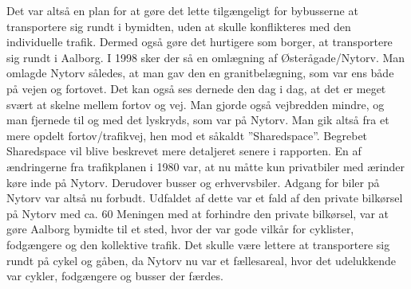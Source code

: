 Det var altså en plan for at gøre det lette tilgængeligt for bybusserne at transportere sig rundt i bymidten, uden at skulle konflikteres med den individuelle trafik. Dermed også gøre det hurtigere som borger, at transportere sig rundt i Aalborg.
I 1998 sker der så en omlægning af Østerågade/Nytorv. 
Man omlagde Nytorv således, at man gav den en granitbelægning, som var ens både på vejen og fortovet. Det kan også ses dernede den dag i dag, at det er meget svært at skelne mellem fortov og vej. Man gjorde også vejbredden mindre, og man fjernede til og med det lyskryds, som var på Nytorv. Man gik altså fra et mere opdelt fortov/trafikvej, hen mod et såkaldt ”Sharedspace”. Begrebet Sharedspace vil blive beskrevet mere detaljeret senere i rapporten. En af ændringerne fra trafikplanen i 1980 var, at nu måtte kun privatbiler med ærinder køre inde på Nytorv. Derudover busser og erhvervsbiler. Adgang for biler på Nytorv var altså nu forbudt. Udfaldet af dette var et fald af den private bilkørsel på Nytorv med ca. 60%
Meningen med at forhindre den private bilkørsel, var at gøre Aalborg bymidte til et sted, hvor der var gode vilkår for cyklister, fodgængere og den kollektive trafik. Det skulle være lettere at transportere sig rundt på cykel og gåben, da Nytorv nu var et fællesareal, hvor det udelukkende var cykler, fodgængere og busser der færdes.
